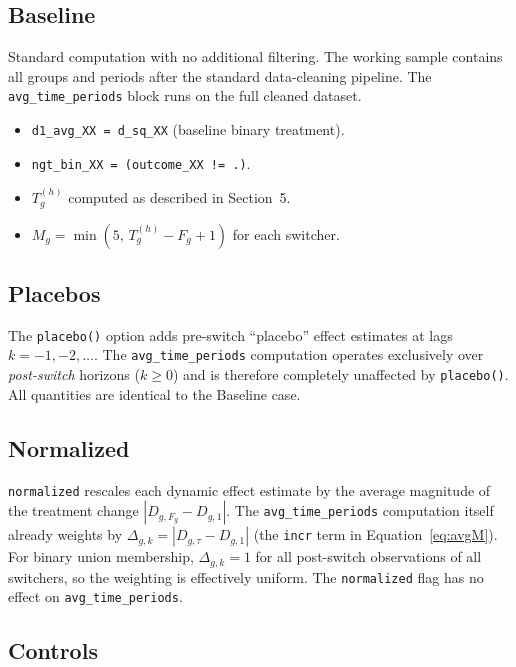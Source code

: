 \documentclass[11pt]{article}
\begin{document}
\subsection{Baseline}

Standard computation with no additional filtering. The working sample contains
all groups and periods after the standard data-cleaning pipeline. The
\texttt{avg\_time\_periods} block runs on the full cleaned dataset.

\begin{itemize}[nosep]
  \item \texttt{d1\_avg\_XX = d\_sq\_XX} (baseline binary treatment).
  \item \texttt{ngt\_bin\_XX = (outcome\_XX != .)}.
  \item $T_g^{(h)}$ computed as described in Section~5.
  \item $M_g = \min(5,\, T_g^{(h)} - F_g + 1)$ for each switcher.
\end{itemize}

\subsection{Placebos}

The \texttt{placebo()} option adds pre-switch ``placebo'' effect estimates at
lags $k = -1, -2, \dots$. The \texttt{avg\_time\_periods} computation
operates exclusively over \emph{post-switch} horizons ($k \geq 0$) and is
therefore completely unaffected by \texttt{placebo()}. All quantities are
identical to the Baseline case.

\subsection{Normalized}

\texttt{normalized} rescales each dynamic effect estimate by the average
magnitude of the treatment change $|D_{g,F_g} - D_{g,1}|$. The
\texttt{avg\_time\_periods} computation itself already weights by
$\Delta_{g,k} = |D_{g,\tau} - D_{g,1}|$ (the \texttt{incr} term in
Equation~\eqref{eq:avgM}). For binary union membership, $\Delta_{g,k} = 1$
for all post-switch observations of all switchers, so the weighting is
effectively uniform. The \texttt{normalized} flag has no effect on
\texttt{avg\_time\_periods}.

\subsection{Controls}
\end{document}

